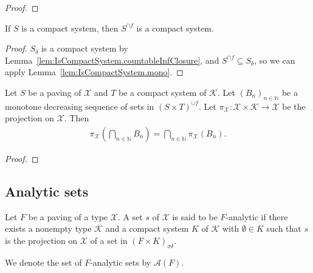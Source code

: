 \begin{proof}

\end{proof}


\begin{lemma}\label{lem:IsCompactSystem.infClosure}
  \leanok
If $S$ is a compact system, then $S^{\cap f}$ is a compact system.
\end{lemma}

\begin{proof}
$S_\delta$ is a compact system by Lemma~\ref{lem:IsCompactSystem.countableInfClosure}, and $S^{\cap f} \subseteq S_\delta$, so we can apply Lemma~\ref{lem:IsCompactSystem.mono}.
\end{proof}


\begin{theorem}\label{thm:fst_iInter_of_supClosure_image2_prod_of_antitone}
  \leanok
Let $S$ be a paving of $\mathcal{X}$ and $T$ be a compact system of $\mathcal{K}$.
Let $(B_n)_{n \in \mathbb{N}}$ be a monotone decreasing sequence of sets in $(S \times T)^{\cup f}$.
Let $\pi_{\mathcal{X}} : \mathcal{X} \times \mathcal{K} \to \mathcal{X}$ be the projection on $\mathcal{X}$.
Then
\begin{align*}
  \pi_{\mathcal{X}}\left(\bigcap_{n\in\mathbb{N}} B_n\right) = \bigcap_{n\in\mathbb{N}} \pi_{\mathcal{X}}(B_n).
\end{align*}
\end{theorem}

\begin{proof}\leanok

\end{proof}




\subsection{Analytic sets}

\begin{definition}\label{def:IsPavingAnalytic}
  \leanok
Let $F$ be a paving of a type $\mathcal{X}$.
A set $s$ of $\mathcal{X}$ is said to be $F$-analytic if there exists a nonempty type $\mathcal{K}$ and a compact system $K$ of $\mathcal{K}$ with $\emptyset \in K$ such that $s$ is the projection on $\mathcal{X}$ of a set in $(F \times K)_{\sigma \delta}$.

We denote the set of $F$-analytic sets by $\mathcal{A}(F)$.
\end{definition}

